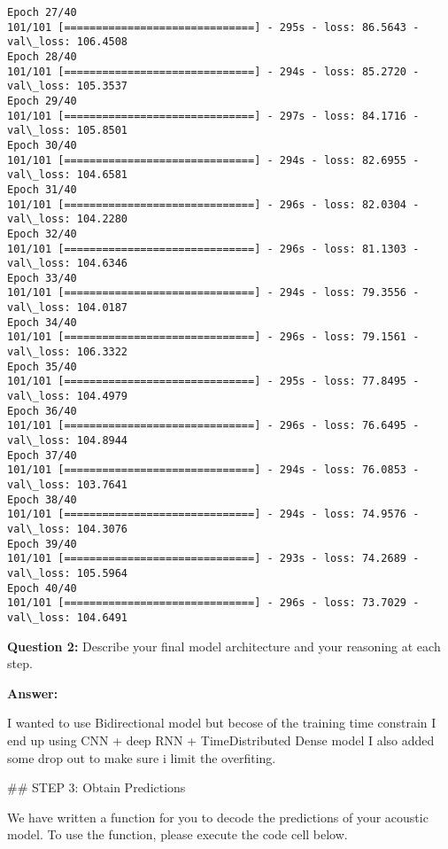 \documentclass[11pt]{article}
\begin{document}
\begin{Verbatim}[commandchars=\\\{\}]
Epoch 27/40
101/101 [==============================] - 295s - loss: 86.5643 - val\_loss: 106.4508
Epoch 28/40
101/101 [==============================] - 294s - loss: 85.2720 - val\_loss: 105.3537
Epoch 29/40
101/101 [==============================] - 297s - loss: 84.1716 - val\_loss: 105.8501
Epoch 30/40
101/101 [==============================] - 294s - loss: 82.6955 - val\_loss: 104.6581
Epoch 31/40
101/101 [==============================] - 296s - loss: 82.0304 - val\_loss: 104.2280
Epoch 32/40
101/101 [==============================] - 296s - loss: 81.1303 - val\_loss: 104.6346
Epoch 33/40
101/101 [==============================] - 294s - loss: 79.3556 - val\_loss: 104.0187
Epoch 34/40
101/101 [==============================] - 296s - loss: 79.1561 - val\_loss: 106.3322
Epoch 35/40
101/101 [==============================] - 295s - loss: 77.8495 - val\_loss: 104.4979
Epoch 36/40
101/101 [==============================] - 296s - loss: 76.6495 - val\_loss: 104.8944
Epoch 37/40
101/101 [==============================] - 294s - loss: 76.0853 - val\_loss: 103.7641
Epoch 38/40
101/101 [==============================] - 294s - loss: 74.9576 - val\_loss: 104.3076
Epoch 39/40
101/101 [==============================] - 293s - loss: 74.2689 - val\_loss: 105.5964
Epoch 40/40
101/101 [==============================] - 296s - loss: 73.7029 - val\_loss: 104.6491

    \end{Verbatim}

    \textbf{Question 2:} Describe your final model architecture and your
reasoning at each step.

\textbf{Answer:}

I wanted to use Bidirectional model but becose of the training time
constrain I end up using CNN + deep RNN + TimeDistributed Dense model I
also added some drop out to make sure i limit the overfiting.

     \#\# STEP 3: Obtain Predictions

We have written a function for you to decode the predictions of your
acoustic model. To use the function, please execute the code cell below.
\end{document}
